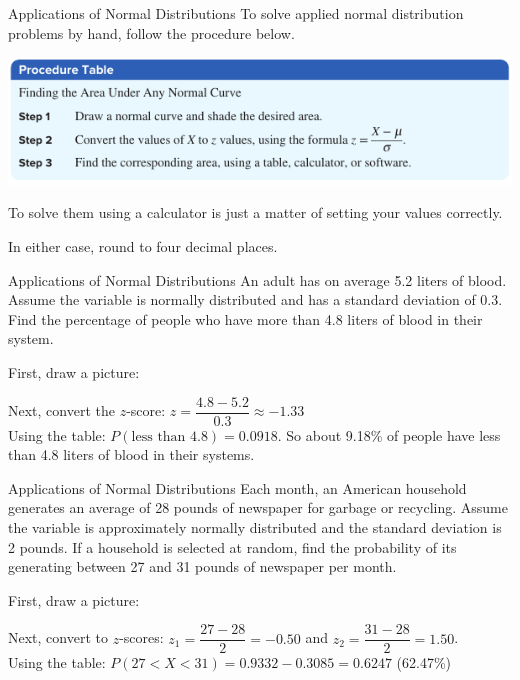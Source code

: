 \documentclass[t, aspectratio=169]{beamer}
\newcommand{\?}{\stackrel{?}{=}}
\begin{document}
	\begin{frame}{Applications of Normal Distributions}
		To solve applied normal distribution problems by hand, follow the procedure below.
		
		\includegraphics[width=\textwidth]{norm-app-proc.png} \pause
		
		To solve them using a calculator is just a matter of setting your values correctly. \pause
		
		In either case, round to four decimal places.
	\end{frame}

	\begin{frame}{Applications of Normal Distributions}
		An adult has on average 5.2 liters of blood. Assume the variable is normally distributed and has a standard deviation of 0.3. Find the percentage of people who have more than 4.8 liters of blood in their system. \pause
		
		First, draw a picture: \vspace{1 in} \pause
		
		Next, convert the $z$-score: $z = \dfrac{4.8 - 5.2}{0.3} \approx -1.33$ \\ \pause
		Using the table: $P(\text{less than 4.8}) = 0.0918$. \pause So about 9.18\% of people have less than 4.8 liters of blood in their systems.
	\end{frame}

	\begin{frame}{Applications of Normal Distributions}
		Each month, an American household generates an average of 28 pounds of newspaper for garbage or recycling. Assume the variable is approximately normally distributed and the standard deviation is 2 pounds. If a household is selected at random, find the probability of its generating between 27 and 31 pounds of newspaper per month. \pause
		
		First, draw a picture: \vspace{1in} \pause
		
		Next, convert to $z$-scores: $z_1 = \dfrac{27 - 28}{2} = -0.50$ \pause and $z_2 = \dfrac{31 - 28}{2} = 1.50$. \pause \\
		Using the table: $P(27 < X < 31) = 0.9332 - 0.3085 = 0.6247$ (62.47\%)
	\end{frame}
\end{document}
